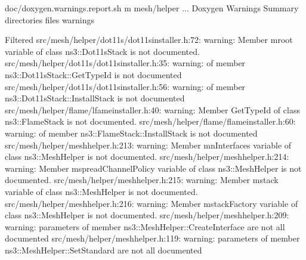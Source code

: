 \documentclass[letterpaper,10pt,english]{sphinxmanual}
\begin{document}
\begin{sphinxVerbatim}[commandchars=\\\{\}]
\PYGZdl{} doc/doxygen.warnings.report.sh \PYGZhy{}m mesh/helper
...
Doxygen Warnings Summary
\PYGZhy{}\PYGZhy{}\PYGZhy{}\PYGZhy{}\PYGZhy{}\PYGZhy{}\PYGZhy{}\PYGZhy{}\PYGZhy{}\PYGZhy{}\PYGZhy{}\PYGZhy{}\PYGZhy{}\PYGZhy{}\PYGZhy{}\PYGZhy{}\PYGZhy{}\PYGZhy{}\PYGZhy{}\PYGZhy{}\PYGZhy{}\PYGZhy{}\PYGZhy{}\PYGZhy{}\PYGZhy{}\PYGZhy{}\PYGZhy{}\PYGZhy{}\PYGZhy{}\PYGZhy{}\PYGZhy{}\PYGZhy{}\PYGZhy{}\PYGZhy{}\PYGZhy{}\PYGZhy{}\PYGZhy{}\PYGZhy{}\PYGZhy{}\PYGZhy{}
   directories
   files
 warnings


Filtered 
src/mesh/helper/dot11s/dot11s\PYGZhy{}installer.h:72: warning: Member m\PYGZus{}root variable of class ns3::Dot11sStack is not documented.
src/mesh/helper/dot11s/dot11s\PYGZhy{}installer.h:35: warning:   of member ns3::Dot11sStack::GetTypeId is not documented
src/mesh/helper/dot11s/dot11s\PYGZhy{}installer.h:56: warning:   of member ns3::Dot11sStack::InstallStack is not documented
src/mesh/helper/flame/lfame\PYGZhy{}installer.h:40: warning: Member GetTypeId  of class ns3::FlameStack is not documented.
src/mesh/helper/flame/flame\PYGZhy{}installer.h:60: warning:   of member ns3::FlameStack::InstallStack is not documented
src/mesh/helper/mesh\PYGZhy{}helper.h:213: warning: Member m\PYGZus{}nInterfaces variable of class ns3::MeshHelper is not documented.
src/mesh/helper/mesh\PYGZhy{}helper.h:214: warning: Member m\PYGZus{}spreadChannelPolicy variable of class ns3::MeshHelper is not documented.
src/mesh/helper/mesh\PYGZhy{}helper.h:215: warning: Member m\PYGZus{}stack variable of class ns3::MeshHelper is not documented.
src/mesh/helper/mesh\PYGZhy{}helper.h:216: warning: Member m\PYGZus{}stackFactory variable of class ns3::MeshHelper is not documented.
src/mesh/helper/mesh\PYGZhy{}helper.h:209: warning: parameters of member ns3::MeshHelper::CreateInterface are not all documented
src/mesh/helper/mesh\PYGZhy{}helper.h:119: warning: parameters of member ns3::MeshHelper::SetStandard are not all documented
\end{sphinxVerbatim}
\end{document}
